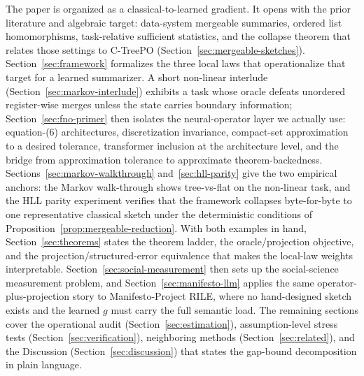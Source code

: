 The paper is organized as a classical-to-learned gradient. It opens with the prior literature and algebraic target: data-system mergeable summaries, ordered list homomorphisms, task-relative sufficient statistics, and the collapse theorem that relates those settings to C-TreePO (Section~\ref{sec:mergeable-sketches}). Section~\ref{sec:framework} formalizes the three local laws that operationalize that target for a learned summarizer. A short non-linear interlude (Section~\ref{sec:markov-interlude}) exhibits a task whose oracle defeats unordered register-wise merges unless the state carries boundary information; Section~\ref{sec:fno-primer} then isolates the neural-operator layer we actually use: equation-(6) architectures, discretization invariance, compact-set approximation to a desired tolerance, transformer inclusion at the architecture level, and the bridge from approximation tolerance to approximate theorem-backedness. Sections~\ref{sec:markov-walkthrough} and~\ref{sec:hll-parity} give the two empirical anchors: the Markov walk-through shows tree-vs-flat on the non-linear task, and the HLL parity experiment verifies that the framework collapses byte-for-byte to one representative classical sketch under the deterministic conditions of Proposition~\ref{prop:mergeable-reduction}. With both examples in hand, Section~\ref{sec:theorems} states the theorem ladder, the oracle/projection objective, and the projection/structured-error equivalence that makes the local-law weights interpretable. Section~\ref{sec:social-measurement} then sets up the social-science measurement problem, and Section~\ref{sec:manifesto-llm} applies the same operator-plus-projection story to Manifesto-Project RILE, where no hand-designed sketch exists and the learned $g$ must carry the full semantic load. The remaining sections cover the operational audit (Section~\ref{sec:estimation}), assumption-level stress tests (Section~\ref{sec:verification}), neighboring methods (Section~\ref{sec:related}), and the Discussion (Section~\ref{sec:discussion}) that states the gap-bound decomposition in plain language.
